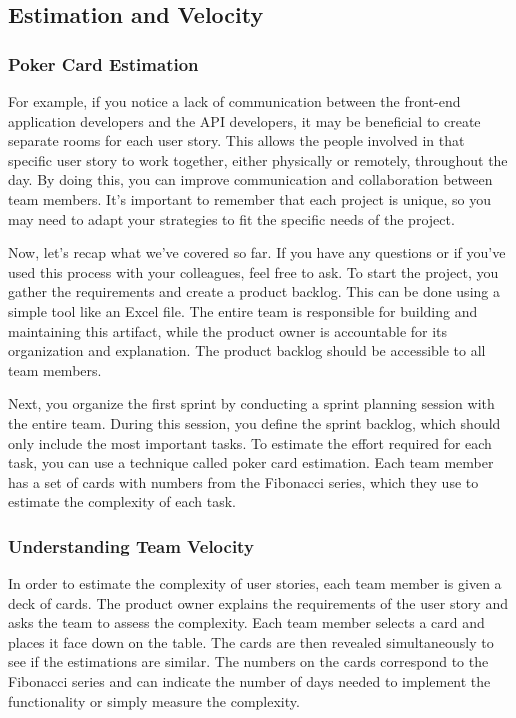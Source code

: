 \subsection{Estimation and Velocity}

\subsubsection{Poker Card Estimation}

For example, if you notice a lack of communication between the front-end
application developers and the API developers, it may be beneficial to
create separate rooms for each user story. This allows the people
involved in that specific user story to work together, either physically
or remotely, throughout the day. By doing this, you can improve
communication and collaboration between team members. It's important to
remember that each project is unique, so you may need to adapt your
strategies to fit the specific needs of the project.

Now, let's recap what we've covered so far. If you have any questions or
if you've used this process with your colleagues, feel free to ask. To
start the project, you gather the requirements and create a product
backlog. This can be done using a simple tool like an Excel file. The
entire team is responsible for building and maintaining this artifact,
while the product owner is accountable for its organization and
explanation. The product backlog should be accessible to all team
members.

Next, you organize the first sprint by conducting a sprint planning
session with the entire team. During this session, you define the sprint
backlog, which should only include the most important tasks. To estimate
the effort required for each task, you can use a technique called poker
card estimation. Each team member has a set of cards with numbers from
the Fibonacci series, which they use to estimate the complexity of each
task.

\subsubsection{Understanding Team Velocity}

In order to estimate the complexity of user stories, each team member is
given a deck of cards. The product owner explains the requirements of
the user story and asks the team to assess the complexity. Each team
member selects a card and places it face down on the table. The cards
are then revealed simultaneously to see if the estimations are similar.
The numbers on the cards correspond to the Fibonacci series and can
indicate the number of days needed to implement the functionality or
simply measure the complexity.

